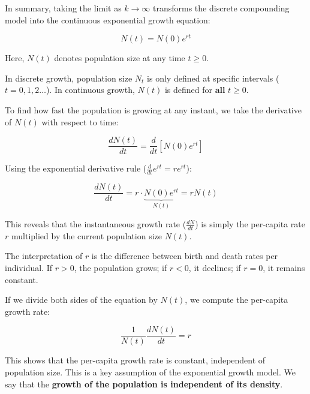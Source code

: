 \documentclass[
  letterpaper,
]{scrbook}
\begin{document}
In summary, taking the limit as \(k \to \infty\) transforms the discrete
compounding model into the continuous exponential growth equation:

\[
N(t) = N(0) e^{rt}
\]

Here, \(N(t)\) denotes population size at any time \(t \ge 0\).

\begin{tcolorbox}[enhanced jigsaw, opacitybacktitle=0.6, toptitle=1mm, bottomrule=.15mm, left=2mm, leftrule=.75mm, title=\textcolor{quarto-callout-important-color}{\faExclamation}\hspace{0.5em}{Key Distinction}, colbacktitle=quarto-callout-important-color!10!white, colframe=quarto-callout-important-color-frame, coltitle=black, breakable, bottomtitle=1mm, toprule=.15mm, opacityback=0, arc=.35mm, rightrule=.15mm, colback=white, titlerule=0mm]

In discrete growth, population size \(N_t\) is only defined at specific
intervals (\(t = 0, 1, 2 \ldots\)). In continuous growth, \(N(t)\) is
defined for \textbf{all} \(t \ge 0\).

\end{tcolorbox}

To find how fast the population is growing at any instant, we take the
derivative of \(N(t)\) with respect to time:

\[
\frac{dN(t)}{dt} = \frac{d}{dt} \left[ N(0) e^{rt} \right]
\]

Using the exponential derivative rule
(\(\frac{d}{dt} e^{rt} = r e^{rt}\)):

\[
\frac{dN(t)}{dt} = r \cdot \underbrace{N(0) e^{rt}}_{N(t)} = r N(t)
\]

\begin{tcolorbox}[enhanced jigsaw, opacitybacktitle=0.6, toptitle=1mm, bottomrule=.15mm, left=2mm, leftrule=.75mm, title=\textcolor{quarto-callout-tip-color}{\faLightbulb}\hspace{0.5em}{Biological Meaning}, colbacktitle=quarto-callout-tip-color!10!white, colframe=quarto-callout-tip-color-frame, coltitle=black, breakable, bottomtitle=1mm, toprule=.15mm, opacityback=0, arc=.35mm, rightrule=.15mm, colback=white, titlerule=0mm]

This reveals that the instantaneous growth rate (\(\frac{dN}{dt}\)) is
simply the per-capita rate \(r\) multiplied by the current population
size \(N(t)\).

The interpretation of \(r\) is the difference between birth and death
rates per individual. If \(r > 0\), the population grows; if \(r < 0\),
it declines; if \(r = 0\), it remains constant.

If we divide both sides of the equation by \(N(t)\), we compute the
per-capita growth rate:

\[
\frac{1}{N(t)} \frac{dN(t)}{dt} = r
\]

This shows that the per-capita growth rate is constant, independent of
population size. This is a key assumption of the exponential growth
model. We say that the \textbf{growth of the population is independent
of its density}.

\end{tcolorbox}
\end{document}

